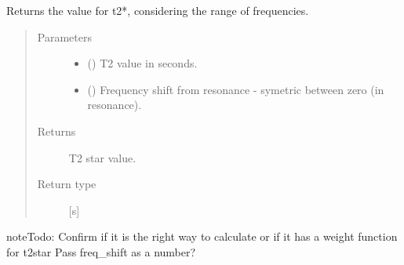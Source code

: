 \documentclass[a4paper,10pt,english]{sphinxmanual}
\begin{document}
\begin{fulllineitems}
\label{\detokenize{autodoc/mrsprint/mrsprint.simulator:mrsprint.simulator.calculate_t2_star}}
Returns the value for t2*, considering the range of frequencies.
\begin{quote}\begin{description}
\item[{Parameters}] \leavevmode\begin{itemize}
\item {} 
 (\sphinxstyleliteralemphasis{\sphinxupquote{ {[}}}\sphinxstyleliteralemphasis{\sphinxupquote{{]}}}) \textendash{} T2 value in seconds.

\item {} 
 (\sphinxstyleliteralemphasis{\sphinxupquote{ {[}}}\sphinxstyleliteralemphasis{\sphinxupquote{{]}}}) \textendash{} Frequency shift from resonance - symetric
between zero (in resonance).

\end{itemize}

\item[{Returns}] \leavevmode
T2 star value.

\item[{Return type}] \leavevmode
{} {[}s{]}

\end{description}\end{quote}

\begin{sphinxadmonition}{note}{\label{autodoc/mrsprint/mrsprint.simulator:index-1}Todo:}
Confirm if it is the right way to calculate or if it has a weight function for t2star
Pass freq\_shift as a number?
\end{sphinxadmonition}

\end{fulllineitems}

\end{document}
